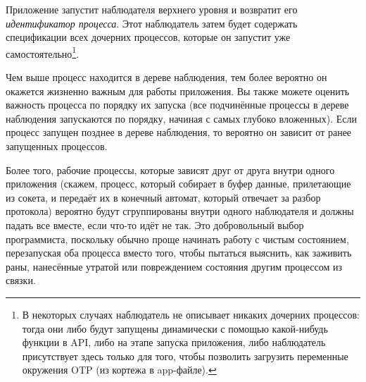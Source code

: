 Приложение запустит наблюдателя верхнего уровня и возвратит его \emph{идентификатор процесса}. Этот наблюдатель затем будет содержать спецификации всех дочерних процессов, которые он запустит уже самостоятельно\footnote{В некоторых случаях наблюдатель не описывает никаких дочерних процессов: тогда они либо будут запущены динамически с помощью какой-нибудь функции в API, либо на этапе запуска приложения, либо наблюдатель присутствует здесь только для того, чтобы позволить загрузить переменные окружения OTP (из кортежа  в app-файле).}.

Чем выше процесс находится в дереве наблюдения, тем более вероятно он окажется жизненно важным для работы приложения. Вы также можете оценить важность процесса по порядку их запуска (все подчинённые процессы в дереве наблюдения запускаются по порядку, начиная с самых глубоко вложенных). Если процесс запущен позднее в дереве наблюдения, то вероятно он зависит от ранее запущенных процессов.

Более того, рабочие процессы, которые зависят друг от друга внутри одного приложения (скажем, процесс, который собирает в буфер данные, прилетающие из сокета, и передаёт их в конечный автомат, который отвечает за разбор протокола) вероятно будут сгруппированы внутри одного наблюдателя и должны падать все вместе, если что-то идёт не так. Это добровольный выбор программиста, поскольку обычно проще начинать работу с чистым состоянием, перезапуская оба процесса вместо того, чтобы пытаться выяснить, как заживить раны, нанесённые утратой или повреждением состояния другим процессом из связки.

